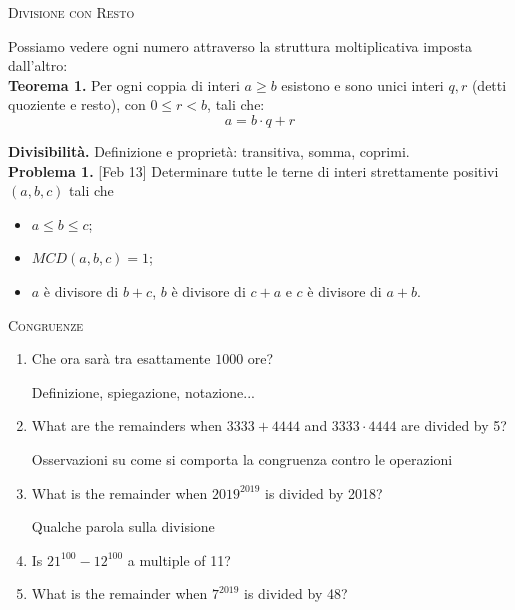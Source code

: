 \documentclass[a4paper]{article}
\theoremstyle{remark}
\theoremstyle{definition}
\begin{document}
\begin{multicols}{2}
	
	
	\begin{center}
		\textsc{Divisione con Resto}
	\end{center}
	
	\textsf{Possiamo vedere ogni numero attraverso la struttura moltiplicativa imposta dall'altro:}\\
	
	\textbf{Teorema 1.}  Per ogni coppia di interi $ a \geq b $ esistono e sono unici interi $ q, r $ (detti quoziente e resto), con $ 0 \leq r < b $, tali che: \[ a = b \cdot q +r \]
	
	\textbf{Divisibilità.} Definizione e proprietà: transitiva, somma, coprimi. \\
	
	\textbf{Problema 1.} [Feb 13] Determinare tutte le terne di interi strettamente positivi $ (a, b, c) $ tali che
	\begin{itemize}
		\item  $ a \leq b \leq c $;
		\item  $ MCD (a, b, c) = 1 $;
		\item  $ a $ è divisore di $ b + c $, $ b $ è divisore di $ c + a $ e $ c $ è divisore di $ a + b $.
	\end{itemize}

	\begin{center}
		\textsc{Congruenze}
	\end{center}
	\begin{enumerate}
		\item  Che ora sarà tra esattamente $ 1000 $ ore?
		
		\textsf{Definizione, spiegazione, notazione...}
		
		\item What are the remainders when $ 3333 + 4444 $ and $ 3333 \cdot 4444 $ are divided by 5?
		
		\textsf{Osservazioni su come si comporta la congruenza contro le operazioni}
		
		\item What is the remainder when $ 2019^{2019} $ is divided by 2018?
		
		\textsf{Qualche parola sulla divisione}
		
		\item Is $ 21^{100} - 12^{100} $ a multiple of 11?
		
		\item What is the remainder when $ 7^{2019} $ is divided by 48?


\end{enumerate}
\end{multicols}
\end{document}
